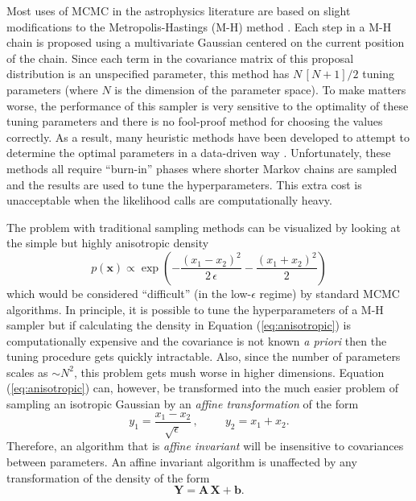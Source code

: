 \documentclass[12pt,preprint]{aastex}
\newcommand{\foreign}[1]{\emph{#1}}
\newcommand{\Eq}[1]{Equation (\ref{eq:#1})}
\newcommand{\eq}[1]{Equation (\ref{eq:#1})}
\newcommand{\eqlabel}[1]{\label{eq:#1}}
\begin{document}
Most uses of MCMC in the astrophysics literature are based on slight
modifications to the Metropolis-Hastings (M-H) method
\citep[e.g.][]{MacKay:2003}. Each step in a M-H chain is proposed using a
multivariate Gaussian centered on the current position of the chain. Since
each term in the covariance matrix of this proposal distribution is an
unspecified parameter, this method has $N\,[N+1]/2$ tuning parameters (where
$N$ is the dimension of the parameter space).  To make matters worse, the
performance of this sampler is very sensitive to the optimality of these
tuning parameters and there is no fool-proof method for choosing the values
correctly. As a result, many heuristic methods have been developed to attempt
to determine the optimal parameters in a data-driven way
\citep[e.g.][]{Gregory:2005,Dunkley:2005,Widrow:2008}. Unfortunately, these
methods all require ``burn-in'' phases where shorter Markov chains
are sampled and the results are used to tune the hyperparameters. This extra
cost is unacceptable when the likelihood calls are computationally heavy.

The problem with traditional sampling methods can be visualized by looking
at the simple but highly anisotropic density
\begin{equation}
    \eqlabel{anisotropic}
    p(\mathbf{x}) \propto \exp \left (-\frac{(x_1-x_2)^2}{2\,\epsilon}
                                        - \frac{(x_1+x_2)^2}{2} \right )
\end{equation}
which would be considered ``difficult'' (in the low-$\epsilon$ regime) by
standard MCMC algorithms. In principle, it is possible to tune the
hyperparameters of a M-H sampler but if calculating the density in
\eq{anisotropic} is computationally expensive and the covariance is not
known \foreign{a priori} then the tuning procedure gets quickly intractable.
Also, since the number of parameters scales as $\sim N^2$, this problem gets
mush worse in higher dimensions.
\Eq{anisotropic} can, however, be transformed into the much easier problem of
sampling an isotropic Gaussian by an \emph{affine transformation} of the form
\begin{equation}
    y_1 = \frac{x_1-x_2}{\sqrt{\epsilon}} \, , \hspace{1cm} y_2 = x_1 + x_2.
\end{equation}
Therefore, an algorithm that is \emph{affine invariant} will be insensitive to
covariances between parameters. An affine invariant algorithm is unaffected by
any transformation of the density of the form
\begin{equation}
    \mathbf{Y} = \mathbf{A}\, \mathbf{X} + \mathbf{b}.
\end{equation}
\end{document}
